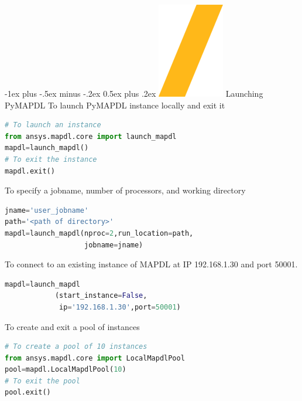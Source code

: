 \documentclass[9pt,landscape]{article}
\makeatletter
\renewcommand{\section}{\@startsection{section}{1}{0mm}%
                                {-1ex plus -.5ex minus -.2ex}%
                                {0.5ex plus .2ex}%
                                {\normalfont\large\bfseries}}
\makeatother
\begin{document}
\begin{multicols}{3}
\setlength{\premulticols}{1pt}
\setlength{\postmulticols}{1pt}
\setlength{\multicolsep}{1pt}
\setlength{\columnsep}{2pt}

\section{\includegraphics[height=\fontcharht\font`\S]{slash.png} Launching PyMAPDL}
To launch PyMAPDL instance locally and exit it
\begin{lstlisting}[language=Python]
# To launch an instance
from ansys.mapdl.core import launch_mapdl
mapdl=launch_mapdl()
# To exit the instance
mapdl.exit()
\end{lstlisting}

To specify a jobname, number of processors, and working directory
\begin{lstlisting}[language=Python]
jname='user_jobname'
path='<path of directory>'
mapdl=launch_mapdl(nproc=2,run_location=path,
                   jobname=jname)
\end{lstlisting}

To connect to an existing instance of MAPDL at IP 192.168.1.30 and port 50001.
\begin{lstlisting}[language=Python]
mapdl=launch_mapdl
            (start_instance=False,
             ip='192.168.1.30',port=50001)
\end{lstlisting}
To create and exit a pool of instances
\begin{lstlisting}[language=Python]
# To create a pool of 10 instances
from ansys.mapdl.core import LocalMapdlPool
pool=mapdl.LocalMapdlPool(10)
# To exit the pool
pool.exit()
\end{lstlisting}


\end{multicols}
\end{document}
